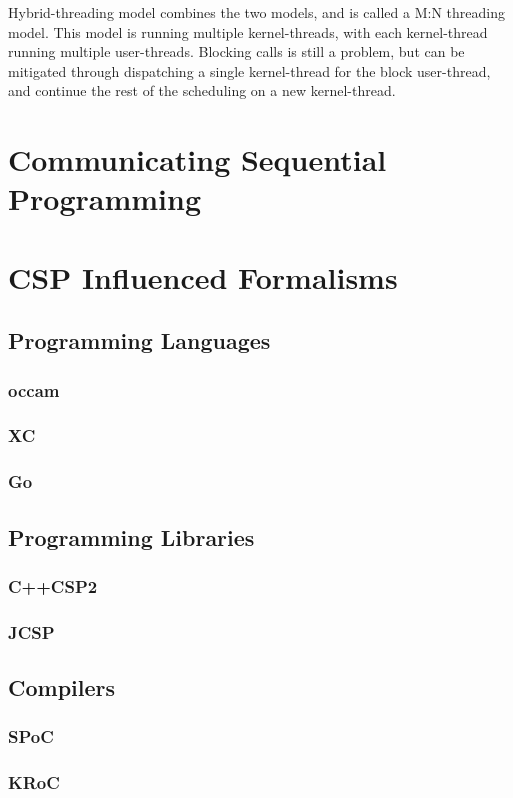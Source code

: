 Hybrid-threading model combines the two models, and is called a M:N threading model. This model is running multiple kernel-threads, with each kernel-thread running multiple user-threads. Blocking calls is still a problem, but can be mitigated through dispatching a single kernel-thread for the block user-thread, and continue the rest of the scheduling on a new kernel-thread. 


\section{Communicating Sequential Programming}
\label{sec:csp}




\section{CSP Influenced Formalisms}
\label{sec:csp_formalisms}




\subsection{Programming Languages}
\label{subsec:csp_prog_lang}


\subsubsection*{occam}
\subsubsection*{XC}
\subsubsection*{Go}


\subsection{Programming Libraries}
\label{subsec:csp_prog_lib}


\subsubsection*{C++CSP2}
\subsubsection*{JCSP}


\subsection{Compilers}
\label{subsec:csp_compilers}


\subsubsection*{SPoC}
\subsubsection*{KRoC}



